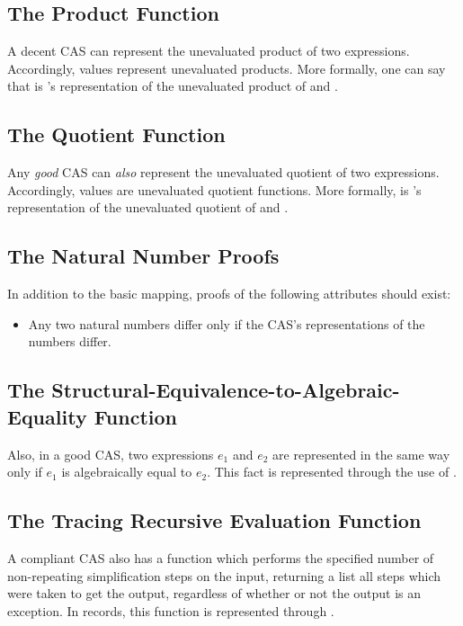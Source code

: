 \documentclass{report}
\begin{document}
\subsection{The Product Function}
A decent CAS can represent the unevaluated product of two expressions.  Accordingly,  values represent unevaluated products.  More formally, one can say that     is 's representation of the unevaluated product of  and .

\subsection{The Quotient Function}
Any \emph{good} CAS can \emph{also} represent the unevaluated quotient of two expressions.  Accordingly,  values are unevaluated quotient functions.  More formally,     is 's representation of the unevaluated quotient of  and .

\subsection{The Natural Number Proofs}
In addition to the basic mapping, proofs of the following attributes should exist:

\begin{itemize}
  \item Any two natural numbers differ only if the CAS's representations of the numbers differ.
\end{itemize}

\subsection{The Structural-Equivalence-to-Algebraic-Equality Function}
Also, in a good CAS, two expressions \(e_1\) and \(e_2\) are represented in the same way only if \(e_1\) is algebraically equal to \(e_2\).  This fact is represented through the use of .

\subsection{The Tracing Recursive Evaluation Function}
A compliant CAS also has a function which performs the specified number of non-repeating simplification steps on the input, returning a list all steps which were taken to get the output, regardless of whether or not the output is an exception.  In  records, this function is represented through .
\end{document}
